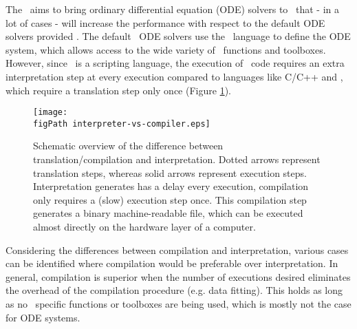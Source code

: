 \psection{\PPODESUITE}
The \PPODESUITE~aims to bring ordinary differential equation (ODE) solvers to \MATLAB~that - in a lot of cases - will increase the performance with respect to the default ODE solvers provided \MATLAB. The default \MATLAB~ODE solvers use the \MATLAB~language to define the ODE system, which allows access to the wide variety of \MATLAB~functions and toolboxes. However, since \MATLAB~is a scripting language, the execution of \MATLAB~code requires an extra interpretation step at every execution compared to languages like C/C++ and \Fortran, which require a translation step only once (Figure \ref{fig:InterpretationVSCompilation}).
\begin{figure}[hb]
 \centering
 \texttt{[image: \\figPath interpreter-vs-compiler.eps]}
 \caption{Schematic overview of the difference between translation/compilation and interpretation. Dotted arrows represent translation steps, whereas solid arrows represent execution steps. Interpretation generates has a delay every execution, compilation only requires a (slow) execution step once. This compilation step generates a binary machine-readable file, which can be executed almost directly on the hardware layer of a computer.}
 \label{fig:InterpretationVSCompilation}
\end{figure}

Considering the differences between compilation and interpretation, various cases can be identified where compilation would be preferable over interpretation. In general, compilation is superior when the number of executions desired eliminates the overhead of the compilation procedure (e.g. data fitting). This holds as long as no \MATLAB~specific functions or toolboxes are being used, which is mostly not the case for ODE systems.


